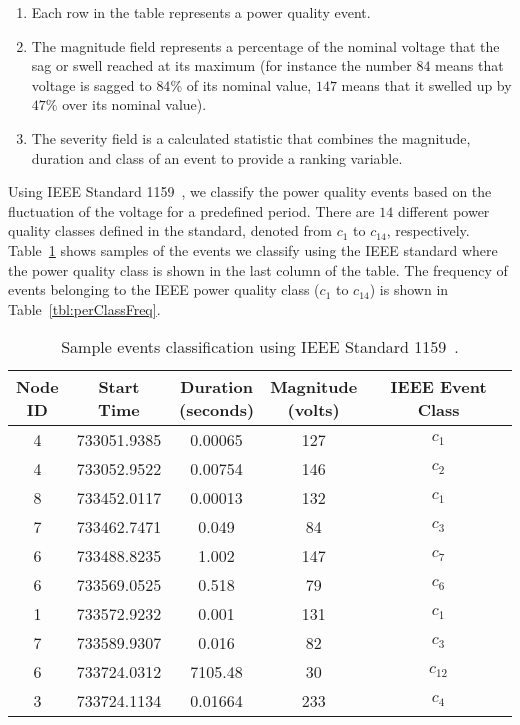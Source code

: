 \begin{enumerate}
\item Each row in the table represents a power quality event.
\item The magnitude field represents a percentage of the nominal voltage that the sag or swell reached at its maximum (for instance the number $84$ means that voltage is sagged to $84\%$ of its nominal value, $147$ means that it swelled up by $47\%$ over its nominal value).
\item The severity field is a calculated statistic that combines the magnitude, duration and class of an event to provide a ranking variable.
\end{enumerate}

Using IEEE Standard 1159~\cite{IEEE09_1159}, we classify the power quality events based on the fluctuation of the voltage for a predefined period. There are $14$ different power quality classes defined in the standard, denoted from $c_1$ to $c_{14}$, respectively. Table~\ref{tbl:sampleClassData} shows samples of the events we classify using the IEEE standard where the power quality class is shown in the last column of the table. The frequency of events belonging to the IEEE power quality class ($c_1$ to $c_{14}$) is shown in Table~\ref{tbl:perClassFreq}.


\begin{table}[!p]
\caption{Sample events classification using IEEE Standard 1159~\cite{IEEE09_1159}.}
\centering \renewcommand*{\arraystretch}{2} 
\begin{tabular}{|c|c|c|c|c|}
\hline \specialcell{Node\\ID} & Start Time & \specialcell{Duration\\(seconds)} & \specialcell{Magnitude\\(volts)} & IEEE Event Class\tabularnewline
\hline 4 & 733051.9385 & 0.00065 & 127 & $c_1$\tabularnewline
 4 & 733052.9522 & 0.00754 & 146 & $c_2$\tabularnewline
 8 & 733452.0117 & 0.00013 & 132 & $c_1$\tabularnewline
 7 & 733462.7471 & 0.049 & 84 & $c_3$\tabularnewline
 6 & 733488.8235 & 1.002 & 147 & $c_7$\tabularnewline
 6 & 733569.0525 & 0.518 & 79 & $c_6$\tabularnewline
 1 & 733572.9232 & 0.001 & 131 & $c_1$\tabularnewline
 7 & 733589.9307 & 0.016 & 82 & $c_3$\tabularnewline
 6 & 733724.0312 & 7105.48 & 30 & $c_{12}$\tabularnewline
 3 & 733724.1134 & 0.01664 & 233 & $c_4$\tabularnewline
\hline 
\end{tabular}
\label{tbl:sampleClassData}
\end{table}


